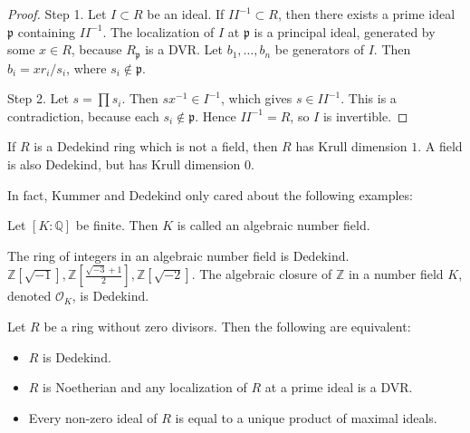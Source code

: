 \begin{proof}
Step 1. Let $I\subset R$ be an ideal.
If $II^{-1}\subset R$, then there
exists a prime ideal $\mathfrak{p}$
containing $II^{-1}$.
The localization of $I$ at
$\mathfrak{p}$ is a principal ideal,
generated by some $x\in R$, because
$R_{\mathfrak{p}}$ is a DVR.
Let $b_1,\dots,b_n$ be generators of
$I$.
Then $b_i=xr_i/s_i$, where
$s_i\notin\mathfrak{p}$.

Step 2. Let $s=\prod s_i$.
Then $sx^{-1}\in I^{-1}$, which gives
$s\in II^{-1}$.
This is a contradiction, because each
$s_i\notin\mathfrak{p}$.
Hence $II^{-1}=R$, so $I$ is
invertible.
\end{proof}

\begin{remark}[AI-generated]
\label{remark-dedekind-iff}
If $R$ is a Dedekind ring which is not a
field, then $R$ has Krull dimension $1$.
A field is also Dedekind, but has Krull
dimension $0$.
\end{remark}

\medskip\noindent
In fact,
Kummer and Dedekind only cared about
the following examples:

\begin{definition}
\label{definition-number-field}
Let $[K:\mathbb{Q}]$ be finite.
Then $K$ is called an algebraic number
field.
\end{definition}

\begin{example}
\label{example-number-field-canonical}
The ring of integers in an algebraic
number field is Dedekind.
$\mathbb{Z}[\sqrt{-1}],
\mathbb{Z}\left[\frac{
\sqrt{-3}+1}{2}\right],
\mathbb{Z}[\sqrt{-2}]$.
The algebraic closure of $\mathbb{Z}$
in a number field $K$,
denoted $\mathcal{O}_K$,
is Dedekind.
\end{example}

\begin{theorem}
\label{theorem-dedekind-equivalent-conditions}
Let $R$ be a ring without zero divisors.
Then the following are equivalent:
\begin{itemize}
\item[(i)] $R$ is Dedekind.
\item[(ii)] $R$ is Noetherian and any
localization of $R$ at a prime ideal is
a DVR.
\item[(iii)] Every non-zero ideal of $R$
is equal to a unique product of maximal
ideals.
\end{itemize}
\end{theorem}


